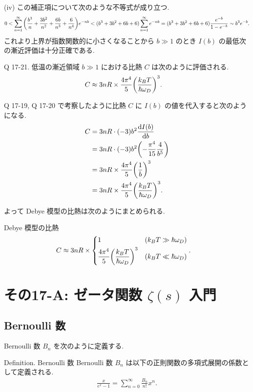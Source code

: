 \documentclass[uplatex,dvipdfmx,a4paper,11pt]{jlreq}
\theoremstyle{definition}
\begin{document}
(iv)
この補正項について次のような不等式が成り立つ.
\begin{align}
  0 < \sum_{n=1}^{\infty}\qty(\frac{b^3}{n} + \frac{3b^2}{n^2} + \frac{6b}{n^3} + \frac{6}{n^4})e^{-nb} < (b^3 + 3b^2 + 6b + 6)\sum_{n=1}^{\infty}e^{-nb} = (b^3 + 3b^2 + 6b + 6)\frac{e^{-b}}{1 - e^{-b}}\sim b^3e^{-b}.
\end{align}
これより上界が指数関数的に小さくなることから $b\gg 1$ のとき $I(b)$ の最低次の漸近評価は十分正確である.
\begin{itembox}[l]{Q 17-21.}
  低温の漸近領域 $b\gg 1$ における比熱 $C$ は次のように評価される.
  \begin{align}
    C & \approx 3nR\times\frac{4\pi^4}{5}\qty(\frac{k_BT}{\hbar\omega_D})^3.
  \end{align}
\end{itembox}
Q 17-19, Q 17-20 で考察したように比熱 $C$ に $I(b)$ の値を代入すると次のようになる.
\begin{align}
  C & = 3nR\cdot(-3)b^2\dv{I(b)}{b}                                  \\
    & = 3nR\cdot(-3)b^2\qty(-\frac{\pi^4}{15}\frac{4}{b^5})          \\
    & = 3nR\times\frac{4\pi^4}{5}\qty(\frac{1}{b})^3                 \\
    & = 3nR\times\frac{4\pi^4}{5}\qty(\frac{k_BT}{\hbar\omega_D})^3.
\end{align}

よって Debye 模型の比熱は次のようにまとめられる.
\begin{itembox}[l]{Debye 模型の比熱}
  \begin{align}
    C & \approx 3nR\times\begin{dcases}
                           1                                                  & (k_BT\gg \hbar\omega_D) \\
                           \frac{4\pi^4}{5}\qty(\frac{k_BT}{\hbar\omega_D})^3 & (k_BT\ll \hbar\omega_D)
                         \end{dcases}.
  \end{align}
\end{itembox}

\section{その17-A: ゼータ関数 $\zeta(s)$ 入門}
\subsection{Bernoulli 数}
Bernoulli 数 $B_n$ を次のように定義する.
\begin{itembox}[l]{Definition. Bernoulli 数}
  Bernoulli 数 $B_n$ は以下の正則関数の多項式展開の係数として定義される.
  \begin{align}
    \frac{x}{e^x - 1} = \sum_{n=0}^{\infty}\frac{B_n}{n!}x^n.
  \end{align}
\end{itembox}
\end{document}

